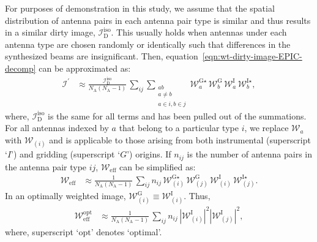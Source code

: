 \documentclass[a4paper,fleqn,usenatbib]{mnras}
\newcommand{\Nant}{N_\textrm{A}}
\begin{document}
For purposes of demonstration in this study, we assume that the spatial distribution of antenna pairs in each antenna pair type is similar and thus results in a similar dirty image, $\mathcal{I}_\textrm{D}^\textrm{iso}$. This usually holds when antennas under each antenna type are chosen randomly or identically such that differences in the synthesized beams are insignificant. Then, equation~\ref{eqn:wt-dirty-image-EPIC-decomp} can be approximated as:
\begin{align}\label{eqn:wt-dirty-image-EPIC-decomp-approx1}
  \mathcal{I}^\prime &\approx \frac{\mathcal{I}_\textrm{D}^\textrm{iso}}{\Nant(\Nant-1)}\,\sum_{ij}\sum_{\substack{ab\\a\ne b\\a\in i, b\in j}} \mathcal{W}^{\textrm{G}\star}_a\,\mathcal{W}^\textrm{G}_b\,\mathcal{W}^\textrm{I}_a\,\mathcal{W}^{\textrm{I}\star}_b,
\end{align}
where, $\mathcal{I}_\textrm{D}^\textrm{iso}$ is the same for all terms and has been pulled out of the summations. For all antennas indexed by $a$ that belong to a particular type $i$, we replace $\mathcal{W}_a$ with $\mathcal{W}_{(i)}$ and is applicable to those arising from both instrumental (superscript `$I$') and gridding (superscript `$G$') origins. If $n_{ij}$ is the number of antenna pairs in the antenna pair type $ij$, $\mathcal{W}_\textrm{eff}$ can be simplified as:
\begin{align}\label{eqn:wt-dirty-image-EPIC-decomp-approx2}
  \mathcal{W}_\textrm{eff} &\approx \frac{1}{\Nant(\Nant-1)}\,\sum_{ij}n_{ij}\,\mathcal{W}^{\textrm{G}\star}_{(i)}\,\mathcal{W}^\textrm{G}_{(j)}\,\mathcal{W}^\textrm{I}_{(i)}\,\mathcal{W}^{\textrm{I}\star}_{(j)}.
\end{align}
In an optimally weighted image, $\mathcal{W}^\textrm{G}_{(i)} \equiv \mathcal{W}^\textrm{I}_{(i)}$. Thus,
\begin{align}\label{eqn:effective-weighting-optimal}
  \mathcal{W}_\textrm{eff}^\textrm{opt} &\approx \frac{1}{\Nant(\Nant-1)}\,\sum_{ij} n_{ij}\,\left|\mathcal{W}^\textrm{I}_{(i)}\right|^2\left|\mathcal{W}^\textrm{I}_{(j)}\right|^2,
\end{align}
where, superscript `$\textrm{opt}$' denotes `optimal'.
\end{document}
